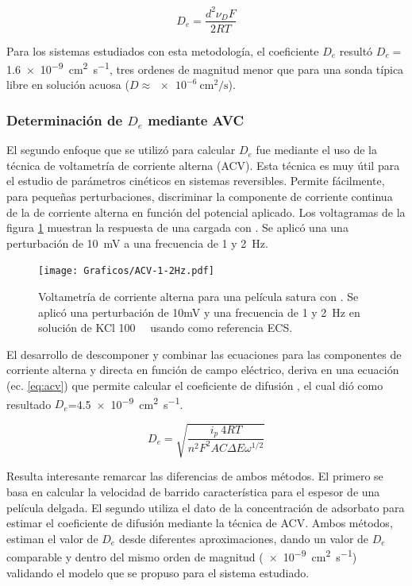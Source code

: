 		 		\begin{equation}
					D_e= \frac{d^2\nu_{\scriptscriptstyle{D}}F}{2RT}
					\label{eq:dh}
			\end{equation}

		 Para los sistemas estudiados con esta metodología, el coeficiente $D_e$ resultó $D_e=$\SI{1.6e-9}{\square\cm\per\second}, tres ordenes de magnitud menor que para una sonda típica libre en solución acuosa ($D\approx \SI{e-6}{\square\cm\per\second}$).  
			
	 \subsubsection*{Determinación de $D_e$ mediante AVC}

    	 El segundo enfoque que se utilizó para calcular $D_e$ fue mediante el uso de la técnica de voltametría de corriente alterna (ACV). Esta técnica es muy útil para el estudio de parámetros cinéticos en sistemas reversibles. Permite fácilmente, para pequeñas perturbaciones, discriminar la componente de corriente continua de la de corriente alterna en función del potencial aplicado. Los voltagramas de la figura \ref{fig:acv} muestran la respuesta de una \pdmF\space cargada con \ru. Se aplicó una una perturbación de \SI{10}{\milli\volt} a una frecuencia de 1 y \SI{2}{\hertz}.

	 			\begin{figure}[ht!]
					\centering
			 	    \texttt{[image: Graficos/ACV-1-2Hz.pdf]}
			        \caption[Voltametrías de corriente alterna]{Voltametría de corriente alterna para una película satura con \ru. Se aplicó una perturbación de 10mV y una frecuencia de 1 y \SI{2}{\hertz} en solución de KCl \SI{100}{\milli\Molar} usando como referencia ECS.}
			        \label{fig:acv}
			       	\end{figure}

    	 El desarrollo de descomponer y combinar las ecuaciones para las componentes de corriente alterna y directa en función de campo eléctrico, deriva en una ecuación (ec. \ref{eq:acv}) que permite calcular el coeficiente de difusión \cite{Wi2000}, el cual dió como resultado $D_e$=\SI{4.5e-9}{\square\cm\per\second}. 
    	 	
    	 		\begin{equation}
					D_e=\sqrt{\frac{i_p\ 4RT}{n^2 F^2 A C \Delta E \omega ^{1/2}}}
					\label{eq:acv}
				 \end{equation}

		
		 Resulta interesante remarcar las diferencias de ambos métodos. El primero se basa en calcular la velocidad de barrido característica para el espesor de una película delgada. El segundo utiliza el dato de la concentración de adsorbato para estimar el coeficiente de difusión mediante la técnica de ACV. Ambos métodos, estiman el valor de $D_e$ desde diferentes aproximaciones, dando un valor de $D_e$ comparable y dentro del mismo orden de magnitud (\SI{e-9}{\square\cm\per\second}) validando el modelo que se propuso para el sistema estudiado.
			
